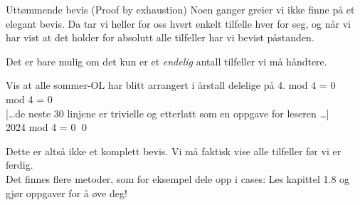 \begin{frame}{Uttømmende bevis (Proof by exhaustion)}
    Noen ganger greier vi ikke finne på et elegant bevis. 
    Da tar vi heller for oss hvert enkelt tilfelle hver for seg, og når vi har vist at det holder 
    for absolutt alle tilfeller har vi bevist påstanden. 
    
    Det er bare mulig om det kun er et \emph{endelig} antall tilfeller vi må håndtere.
    \pause
    \begin{block}{Vis at alle sommer-OL har blitt arrangert i årstall delelige på 4.}
         mod 4 = 0 \checkmark \\
         mod 4 = 0 \checkmark \\
        \pause
        {[\ldots de neste 30 linjene er trivielle og etterlatt som en oppgave for leseren \ldots]}\\
        2024 mod 4 = 0 \checkmark \qed
    \end{block}
    \pause
    Dette er altså ikke et komplett bevis. Vi må faktisk vise alle tilfeller før vi er ferdig.\\

    Det finnes flere metoder, som for eksempel dele opp i cases: Les kapittel 1.8 og gjør oppgaver for å øve deg!
\end{frame}
